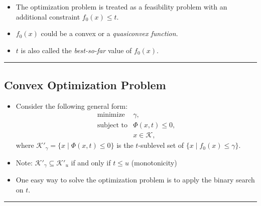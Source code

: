 \documentclass[
]{article}
\begin{document}
\begin{itemize}
\item
  The optimization problem is treated as a feasibility problem with an
  additional constraint \(f_0(x) \le t\).
\item
  \(f_0(x)\) could be a convex or a \emph{quasiconvex function}.
\item
  \(t\) is also called the \emph{best-so-far} value of \(f_0(x)\).
\end{itemize}

\begin{center}\rule{0.5\linewidth}{0.5pt}\end{center}

\subsection{Convex Optimization
Problem}\label{convex-optimization-problem}

\begin{itemize}
\item
  Consider the following general form: \[\begin{array}{ll}
    \text{minimize}     & \gamma, \\
    \text{subject to}   & \Phi(x, t) \le 0, \\
    & x \in \mathcal{K},
  \end{array}\] where \(\mathcal{K}'_\gamma = \{x \mid \Phi(x, t) \le 0\}\)
  is the \(t\)-sublevel set of \(\{x \mid f_0(x) \le \gamma\}\).
\item
  Note: \(\mathcal{K'}_\gamma \subseteq \mathcal{K'}_u\) if and only if
  \(t \le u\) (monotonicity)
\item
  One easy way to solve the optimization problem is to apply the binary
  search on \(t\).
\end{itemize}

\begin{center}\rule{0.5\linewidth}{0.5pt}\end{center}
\end{document}
